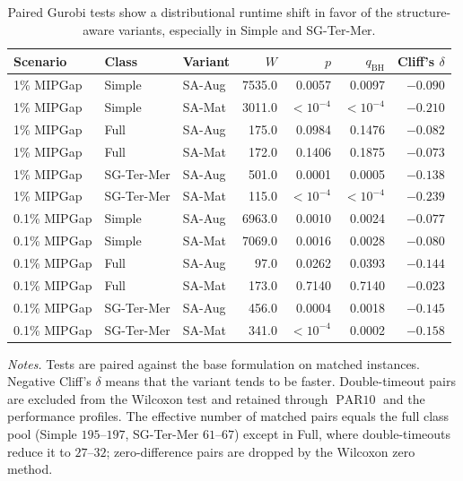 \documentclass[AMA,Times1COL]{WileyNJDv5} %
\newcommand{\methodAug}{SA-Aug}
\newcommand{\methodMat}{SA-Mat}
\newcommand{\PARten}{\ensuremath{\operatorname{PAR10}}}
\providecommand{\DIFaddbegin}{} %
\providecommand{\DIFaddend}{} %
\providecommand{\DIFdelend}{} %
\begin{document}
\DIFdelend \DIFaddbegin \begin{table}[!tbp]
\centering
\caption{Paired Gurobi tests show a distributional runtime shift in favor of the structure-aware variants, especially in Simple and SG-Ter-Mer.}
\label{tab:wilcoxon-structured-gurobi}
\small
\begin{tabular}{@{}lllrrrr@{}}
\toprule
Scenario & Class & Variant & $W$ & $p$ & $q_{\mathrm{BH}}$ & Cliff's $\delta$ \\
\midrule
1\% MIPGap & Simple & \methodAug & 7535.0 & 0.0057 & 0.0097 & $-0.090$ \\
1\% MIPGap & Simple & \methodMat & 3011.0 & $<10^{-4}$ & $<10^{-4}$ & $-0.210$ \\
1\% MIPGap & Full & \methodAug & 175.0 & 0.0984 & 0.1476 & $-0.082$ \\
1\% MIPGap & Full & \methodMat & 172.0 & 0.1406 & 0.1875 & $-0.073$ \\
1\% MIPGap & SG-Ter-Mer & \methodAug & 501.0 & 0.0001 & 0.0005 & $-0.138$ \\
1\% MIPGap & SG-Ter-Mer & \methodMat & 115.0 & $<10^{-4}$ & $<10^{-4}$ & $-0.239$ \\
0.1\% MIPGap & Simple & \methodAug & 6963.0 & 0.0010 & 0.0024 & $-0.077$ \\
0.1\% MIPGap & Simple & \methodMat & 7069.0 & 0.0016 & 0.0028 & $-0.080$ \\
0.1\% MIPGap & Full & \methodAug & 97.0 & 0.0262 & 0.0393 & $-0.144$ \\
0.1\% MIPGap & Full & \methodMat & 173.0 & 0.7140 & 0.7140 & $-0.023$ \\
0.1\% MIPGap & SG-Ter-Mer & \methodAug & 456.0 & 0.0004 & 0.0018 & $-0.145$ \\
0.1\% MIPGap & SG-Ter-Mer & \methodMat & 341.0 & $<10^{-4}$ & 0.0002 & $-0.158$ \\
\bottomrule
\end{tabular}
\begin{flushleft}\footnotesize
\emph{Notes.} Tests are paired against the base formulation on matched instances. Negative
Cliff's $\delta$ means that the variant tends to be faster. Double-timeout pairs are
excluded from the Wilcoxon test and retained through \PARten{} and the performance
profiles. The effective number of matched pairs equals the full class pool (Simple
$195$--$197$, SG-Ter-Mer $61$--$67$) except in Full, where double-timeouts reduce it to
$27$--$32$; zero-difference pairs are dropped by the Wilcoxon zero method.
\end{flushleft}
\end{table}
\DIFaddend 
\end{document}
